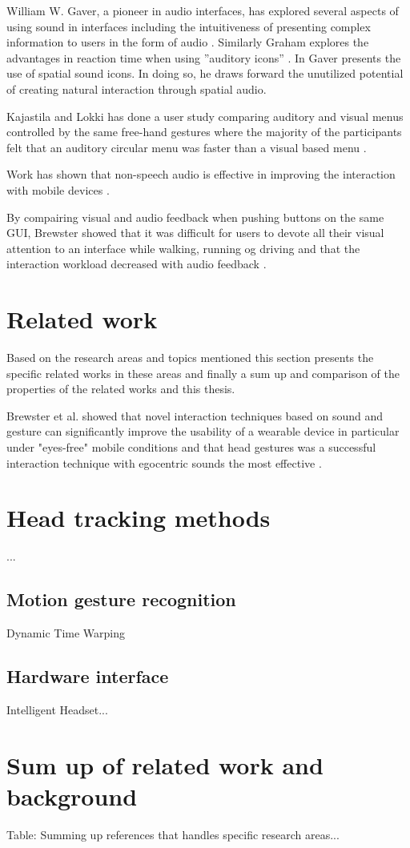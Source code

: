 William W. Gaver, a pioneer in audio interfaces, has explored several aspects of using sound in interfaces including the intuitiveness of presenting complex information to users in the form of audio \cite{gaver_sonicfinder:_1989}. Similarly Graham explores the advantages in reaction time when using ”auditory icons” \cite{graham_use_1999}. In \cite{gaver_auditory_1986} Gaver presents the use of spatial sound icons. In doing so, he draws forward the unutilized potential of creating natural interaction through spatial audio.

Kajastila and Lokki has done a user study comparing auditory and visual menus controlled by the same free-hand gestures where the majority of the participants felt that an auditory circular menu was faster than a visual based menu \cite{kajastila_interaction_2013}.

Work has shown that non-speech audio is effective in improving the interaction with mobile devices \cite{pirhonen_gestural_2002, sawhney_nomadic_2000}.

By compairing visual and audio feedback when pushing buttons on the same GUI, Brewster showed that it was difficult for users to devote all their visual attention to an interface while walking, running og driving and that the interaction workload decreased with audio feedback \cite{brewster_overcoming_2002}.


\section{Related work}
Based on the research areas and topics mentioned this section presents the specific related works in these areas and finally a sum up and comparison of the properties of the related works and this thesis.

Brewster et al. showed that novel interaction techniques based on sound and gesture can significantly improve the usability of a wearable device in particular under "eyes-free" mobile conditions and that head gestures was a successful interaction technique with egocentric sounds the most effective \cite{brewster_multimodaleyes-freeinteraction_2003}.


\section{Head tracking methods}
...

\subsection{Motion gesture recognition}
Dynamic Time Warping \cite{salvador_toward_2007}

\subsection{Hardware interface}
Intelligent Headset...


\section{Sum up of related work and background}
Table: Summing up references that handles specific research areas...














